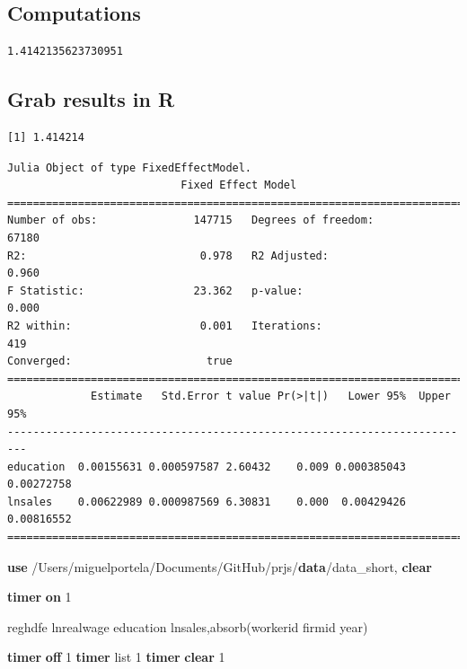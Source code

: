 \documentclass[
  12pt,
]{article}
\newenvironment{Shaded}{\begin{snugshade}}{\end{snugshade}}
\newcommand{\FunctionTok}[1]{\textcolor[rgb]{0.00,0.00,0.00}{#1}}
\newcommand{\KeywordTok}[1]{\textcolor[rgb]{0.13,0.29,0.53}{\textbf{#1}}}
\newcommand{\NormalTok}[1]{#1}
\newcommand{\OtherTok}[1]{\textcolor[rgb]{0.56,0.35,0.01}{#1}}
\begin{document}
\hypertarget{computations}{%
\subsection{Computations}\label{computations}}

\begin{verbatim}
1.4142135623730951
\end{verbatim}

\hypertarget{grab-results-in-r}{%
\subsection{Grab results in R}\label{grab-results-in-r}}

\begin{verbatim}
[1] 1.414214
\end{verbatim}

\begin{verbatim}
Julia Object of type FixedEffectModel.
                           Fixed Effect Model                           
=========================================================================
Number of obs:               147715   Degrees of freedom:           67180
R2:                           0.978   R2 Adjusted:                  0.960
F Statistic:                 23.362   p-value:                      0.000
R2 within:                    0.001   Iterations:                     419
Converged:                     true   
=========================================================================
             Estimate   Std.Error t value Pr(>|t|)   Lower 95%  Upper 95%
-------------------------------------------------------------------------
education  0.00155631 0.000597587 2.60432    0.009 0.000385043 0.00272758
lnsales    0.00622989 0.000987569 6.30831    0.000  0.00429426 0.00816552
=========================================================================
\end{verbatim}

\begin{Shaded}
\begin{Highlighting}[]
\KeywordTok{use}\NormalTok{ /Users/miguelportela/Documents/GitHub/prjs/}\KeywordTok{data}\NormalTok{/data_short, }\KeywordTok{clear}

\KeywordTok{timer} \KeywordTok{on}\NormalTok{ 1}

\NormalTok{    reghdfe lnrealwage education lnsales,absorb(workerid firmid }\FunctionTok{year}\NormalTok{)}

\KeywordTok{timer} \KeywordTok{off}\NormalTok{ 1}
\KeywordTok{timer} \OtherTok{list}\NormalTok{ 1}
\KeywordTok{timer} \KeywordTok{clear}\NormalTok{ 1}
\end{Highlighting}
\end{Shaded}
\end{document}
